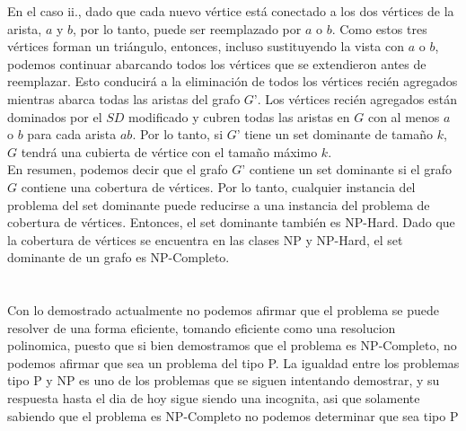 \begin{itemize}
En el caso ii., dado que cada nuevo vértice está conectado a los dos vértices de la arista, $a$ y $b$, por lo tanto, puede ser reemplazado por $a$ o $b$. Como estos tres vértices forman un triángulo, entonces, incluso sustituyendo la vista con $a$ o $b$, podemos continuar abarcando todos los vértices que se extendieron antes de reemplazar. Esto conducirá a la eliminación de todos los vértices recién agregados mientras abarca todas las aristas del grafo $G’$. Los vértices recién agregados están dominados por el $SD$ modificado y cubren todas las aristas en $G$ con al menos $a$ o $b$ para cada arista $ab$. Por lo tanto, si $G’$ tiene un set  dominante de tamaño $k$, $G$ tendrá una cubierta de vértice con el tamaño máximo $k$.\\

En resumen, podemos decir que el grafo $G’$ contiene un set dominante si el grafo $G$ contiene una cobertura de vértices. Por lo tanto, cualquier instancia del problema del set dominante puede reducirse a una instancia del problema de cobertura de vértices. Entonces, el set dominante también es NP-Hard. Dado que la cobertura de vértices se encuentra en las clases NP y NP-Hard, el set dominante de un grafo es NP-Completo.

\end{itemize}

    
    
\section{}
Con lo demostrado actualmente no podemos afirmar que el problema se puede resolver de una forma eficiente, tomando eficiente como una resolucion polinomica, puesto que si bien demostramos que el problema es NP-Completo, no podemos afirmar que sea un problema del tipo P. La igualdad entre los problemas tipo P y NP es uno de los problemas que se siguen intentando demostrar, y su respuesta hasta el dia de hoy sigue siendo una incognita, asi que solamente sabiendo que el problema es NP-Completo no podemos determinar que sea tipo P



